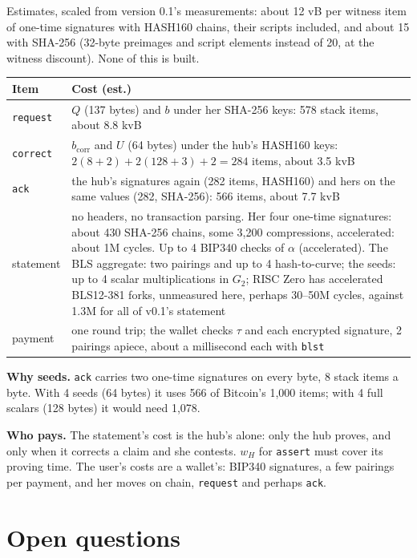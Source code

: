\documentclass[11pt]{article}
\theoremstyle{plain}
\theoremstyle{definition}
\newcommand{\bcorr}{b_{\mathrm{corr}}}
\newcommand{\tx}[1]{\texttt{#1}}
\begin{document}
Estimates, scaled from version 0.1's measurements: about 12 vB per
witness item of one-time signatures with HASH160 chains, their scripts
included, and about 15 with SHA-256 (32-byte preimages and script
elements instead of 20, at the witness discount). None of this is
built.

\begin{center}
\begin{tabularx}{\linewidth}{lL}
\toprule
Item & Cost (est.) \\
\midrule
\tx{request} & $Q$ (137 bytes) and $b$ under her SHA-256 keys: 578 stack items, about 8.8 kvB \\
\tx{correct} & $\bcorr$ and $U$ (64 bytes) under the hub's HASH160 keys: $2(8 + 2) + 2(128 + 3) + 2 = 284$ items, about 3.5 kvB \\
\tx{ack} & the hub's signatures again (282 items, HASH160) and hers on the same values (282, SHA-256): 566 items, about 7.7 kvB \\
statement & no headers, no transaction parsing. Her four one-time signatures: about 430 SHA-256 chains, some 3,200 compressions, accelerated: about 1M cycles. Up to 4 BIP340 checks of $\alpha$ (accelerated). The BLS aggregate: two pairings and up to 4 hash-to-curve; the seeds: up to 4 scalar multiplications in $G_2$; RISC Zero has accelerated BLS12-381 forks, unmeasured here, perhaps 30--50M cycles, against 1.3M for all of v0.1's statement \\
payment & one round trip; the wallet checks $\tau$ and each encrypted signature, 2 pairings apiece, about a millisecond each with \tx{blst} \\
\bottomrule
\end{tabularx}
\end{center}

\textbf{Why seeds.} \tx{ack} carries two one-time signatures on every
byte, 8 stack items a byte. With 4 seeds (64 bytes) it uses 566 of
Bitcoin's 1,000 items; with 4 full scalars (128 bytes) it would need
1,078.

\textbf{Who pays.} The statement's cost is the hub's alone: only the
hub proves, and only when it corrects a claim and she contests. $w_H$
for \tx{assert} must cover its proving time. The user's costs are a
wallet's: BIP340 signatures, a few pairings per payment, and her moves
on chain, \tx{request} and perhaps \tx{ack}.

\section{Open questions}\label{sec:open}
\end{document}
